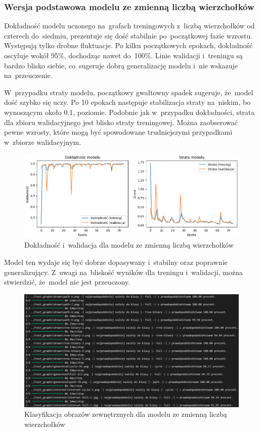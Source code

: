 \subsubsection{Wersja podstawowa modelu ze zmienną liczbą wierzchołków}

Dokładność modelu uczonego na~grafach treningowych z~liczbą wierzchołków od czterech do~siedmiu,
prezentuje się dość stabilnie po~początkowej fazie wzrostu. Występują tylko drobne fluktuacje.
Po kilku początkowych epokach, dokładność oscyluje wokół 95\%, dochodząc nawet do~100\%.
Linie walidacji i~treningu są bardzo blisko siebie, co~sugeruje dobrą generalizację modelu
i~nie wskazuje na~przeuczenie.

W~przypadku straty modelu, początkowy gwałtowny spadek sugeruje, że~model dość szybko się uczy.
Po 10 epokach następuje stabilizacja straty na~niskim, bo wynoszącym około 0.1, poziomie.
Podobnie jak w~przypadku dokładności, strata dla zbioru walidacyjnego jest blisko straty treningowej.
Można zaobserować pewne wzrosty, które mogą być spowodowane trudniejszymi przypadkami w~zbiorze walidacyjnym.

\begin{figure}[ht]
	\centering
	\includegraphics[width=15.5cm]{resources/tests/images/v3/multiple_edges_img.png}
	\caption{Dokładność i~walidacja dla modelu ze zmienną liczbą wierzchołków}
	\label{Fig:tests-var-0a}
\end{figure}
\FloatBarrier

Model ten wydaje się być dobrze dopasywany i~stabilny oraz poprawnie generalizujący.
Z~uwagi na~bliskość wyników dla treningu i~walidacji, można stwierdzić, że~model nie jest przeuczony.

\begin{figure}[ht]
	\centering
	\includegraphics[width=15.5cm]{resources/tests/images/v3/multiple_edges_txt.png}
	\caption{Klasyfikacja obrazów zewnętrznych dla modelu ze zmienną liczbą \\ wierzchołków}
	\label{Fig:tests-var-0b}
\end{figure}
\FloatBarrier

